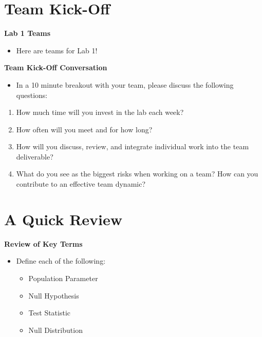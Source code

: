 \documentclass[
]{book}
\providecommand{\tightlist}{%
  \setlength{\itemsep}{0pt}\setlength{\parskip}{0pt}}
\theoremstyle{definition}
\theoremstyle{definition}
\theoremstyle{definition}
\theoremstyle{definition}
\theoremstyle{remark}
\begin{document}
\hypertarget{team-kick-off}{%
\section{Team Kick-Off}\label{team-kick-off}}

\textbf{Lab 1 Teams}

\begin{itemize}
\tightlist
\item
  Here are teams for Lab 1!
\end{itemize}

\textbf{Team Kick-Off Conversation}

\begin{itemize}
\tightlist
\item
  In a 10 minute breakout with your team, please discuss the following questions:
\end{itemize}

\begin{enumerate}
\def\labelenumi{\arabic{enumi}.}
\tightlist
\item
  How much time will you invest in the lab each week?
\item
  How often will you meet and for how long?
\item
  How will you discuss, review, and integrate individual work into the team deliverable?
\item
  What do you see as the biggest risks when working on a team? How can you contribute to an effective team dynamic?
\end{enumerate}

\hypertarget{a-quick-review}{%
\section{A Quick Review}\label{a-quick-review}}

\textbf{Review of Key Terms}

\begin{itemize}
\tightlist
\item
  Define each of the following:

  \begin{itemize}
  \tightlist
  \item
    Population Parameter
  \item
    Null Hypothesis
  \item
    Test Statistic
  \item
    Null Distribution
  \end{itemize}
\end{itemize}
\end{document}
